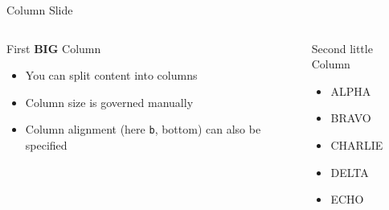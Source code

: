 \documentclass[t]{beamer}
\begin{document}
\begin{frame}{Column Slide}
  \begin{columns}[t]
    \begin{block}{First \textbf{BIG} Column}
      \begin{itemize}
      \item You can split content into columns
      \item Column size is governed manually
      \item Column alignment (here \texttt{b}, bottom) can also be specified
      \end{itemize}
    \end{block}

    \begin{block}{Second {\tiny little} Column}
      \begin{itemize}
      \item ALPHA
      \item BRAVO
      \item CHARLIE
      \item DELTA
      \item ECHO
      \end{itemize}
    \end{block}
  \end{columns}
\end{frame}
\end{document}
